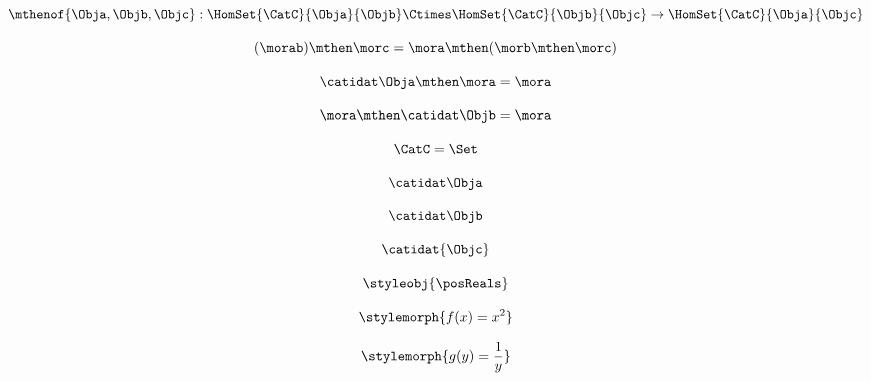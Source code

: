 \begin{forslides}
        \begin{equation}
            \label{eq:19}
            \mthenof{\Obja,\Objb,\Objc}: \HomSet{\CatC}{\Obja}{\Objb} \Ctimes \HomSet{\CatC}{\Objb}{\Objc}\to \HomSet{\CatC}{\Obja}{\Objc}
        \end{equation}

        \begin{equation}
            \label{eq:20}
            (\morab)
            \mthen \morc= \mora \mthen (\morb \mthen \morc)
        \end{equation}

        \begin{equation}
            \label{eq:21}
            \catidat\Obja \mthen \mora = \mora
        \end{equation}

        \begin{equation}
            \label{eq:22}
            \mora \mthen \catidat\Objb = \mora
        \end{equation}

        \begin{equation}
            \label{eq:23}
            \CatC = \Set
        \end{equation}

        \begin{equation}
            \label{eq:24}
            \catidat\Obja
        \end{equation}

        \begin{equation}
            \label{eq:25}
            \catidat\Objb
        \end{equation}

        \begin{equation}
            \label{eq:26}
            \catidat{\Objc}
        \end{equation}

        \begin{equation}
            \label{eq:27}
            \styleobj{\posReals}
        \end{equation}

        \begin{equation}
            \label{eq:28}
            \stylemorph{f(x) = x^2}
        \end{equation}

        \begin{equation}
            \label{eq:29}
            \stylemorph{g(y) = \frac{1}{y}}
        \end{equation}


\end{forslides}
